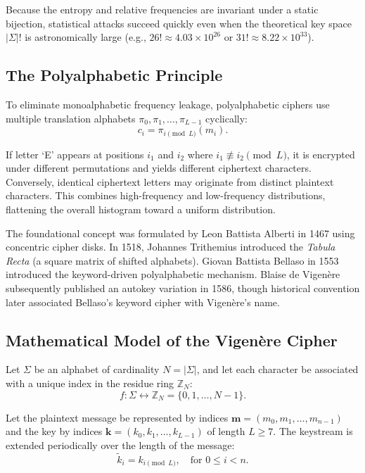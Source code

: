\documentclass[11pt,a4paper]{article}
\begin{document}
Because the entropy and relative frequencies are invariant under a static bijection, statistical attacks succeed quickly even when the theoretical key space $|\Sigma|!$ is astronomically large (e.g., $26! \approx 4.03 \times 10^{26}$ or $31! \approx 8.22 \times 10^{33}$).

\subsection{The Polyalphabetic Principle}

To eliminate monoalphabetic frequency leakage, polyalphabetic ciphers use multiple translation alphabets $\pi_0, \pi_1, \dots, \pi_{L-1}$ cyclically:
\begin{equation}
  c_i = \pi_{i \pmod L}(m_i).
\end{equation}

If letter `E' appears at positions $i_1$ and $i_2$ where $i_1 \not\equiv i_2 \pmod L$, it is encrypted under different permutations and yields different ciphertext characters. Conversely, identical ciphertext letters may originate from distinct plaintext characters. This combines high-frequency and low-frequency distributions, flattening the overall histogram toward a uniform distribution.

The foundational concept was formulated by Leon Battista Alberti in 1467 using concentric cipher disks. In 1518, Johannes Trithemius introduced the \textit{Tabula Recta} (a square matrix of shifted alphabets). Giovan Battista Bellaso in 1553 introduced the keyword-driven polyalphabetic mechanism. Blaise de Vigen\`ere subsequently published an autokey variation in 1586, though historical convention later associated Bellaso's keyword cipher with Vigen\`ere's name.

\subsection{Mathematical Model of the Vigen\`ere Cipher}

Let $\Sigma$ be an alphabet of cardinality $N = |\Sigma|$, and let each character be associated with a unique index in the residue ring $\mathbb{Z}_N$:
\begin{equation}
  f: \Sigma \longleftrightarrow \mathbb{Z}_N = \{0, 1, \dots, N-1\}.
\end{equation}

Let the plaintext message be represented by indices $\mathbf{m} = (m_0, m_1, \dots, m_{n-1})$ and the key by indices $\mathbf{k} = (k_0, k_1, \dots, k_{L-1})$ of length $L \ge 7$. The keystream is extended periodically over the length of the message:
\begin{equation}
  \tilde{k}_i = k_{i \pmod L}, \quad \text{for } 0 \le i < n.
\end{equation}
\end{document}
